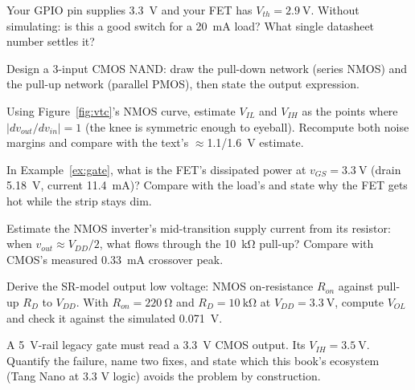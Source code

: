 \begin{exercise}[easy]
Your GPIO pin supplies \qty{3.3}{\volt} and your FET has
$V_{th}=\qty{2.9}{\volt}$. Without simulating: is this a good switch for a
\qty{20}{\milli\ampere} load? What single datasheet number settles it?
\end{exercise}

\begin{exercise}[medium]
Design a 3-input CMOS NAND: draw the pull-down network (series NMOS) and
the pull-up network (parallel PMOS), then state the output expression.
\end{exercise}

\begin{exercise}[medium]
Using Figure~\ref{fig:vtc}'s NMOS curve, estimate $V_{IL}$ and $V_{IH}$ as
the points where $|dv_{out}/dv_{in}|=1$ (the knee is symmetric enough to
eyeball). Recompute both noise margins and compare with the text's
$\approx$1.1/\qty{1.6}{\volt} estimate.
\end{exercise}

\begin{exercise}[medium]
In Example~\ref{ex:gate}, what is the FET's dissipated power at
$v_{GS}=\qty{3.3}{\volt}$ (drain \qty{5.18}{\volt}, current
\qty{11.4}{\milli\ampere})? Compare with the load's and state why the FET
gets hot while the strip stays dim.
\end{exercise}

\begin{exercise}[medium]
Estimate the NMOS inverter's mid-transition supply current from its
resistor: when $v_{out}\approx V_{DD}/2$, what flows through the
\qty{10}{\kilo\ohm} pull-up? Compare with CMOS's measured
\qty{0.33}{\milli\ampere} crossover peak.
\end{exercise}

\begin{exercise}[hard]
Derive the SR-model output low voltage: NMOS on-resistance $R_{on}$ against
pull-up $R_D$ to $V_{DD}$. With $R_{on}=\qty{220}{\ohm}$ and
$R_D=\qty{10}{\kilo\ohm}$ at $V_{DD}=\qty{3.3}{\volt}$, compute $V_{OL}$ and
check it against the simulated \qty{0.071}{\volt}.
\end{exercise}

\begin{exercise}[hard]
A \qty{5}{\volt}-rail legacy gate must read a \qty{3.3}{\volt} CMOS output.
Its $V_{IH}=\qty{3.5}{\volt}$. Quantify the failure, name two fixes, and
state which this book's ecosystem (Tang Nano at 3.3 V logic) avoids the
problem by construction.
\end{exercise}

